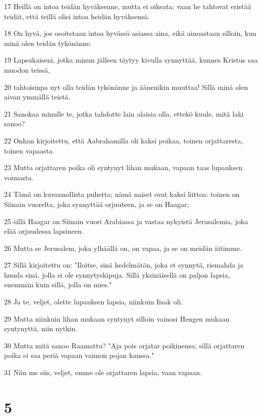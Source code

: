 \par 17 Heillä on intoa teidän hyväksenne, mutta ei oikeata; vaan he tahtovat eristää teidät, että teillä olisi intoa heidän hyväksensä.
\par 18 On hyvä, jos osoitetaan intoa hyvässä asiassa aina, eikä ainoastaan silloin, kun minä olen teidän tykönänne.
\par 19 Lapsukaiseni, jotka minun jälleen täytyy kivulla synnyttää, kunnes Kristus saa muodon teissä,
\par 20 tahtoisinpa nyt olla teidän tykönänne ja äänenikin muuttaa! Sillä minä olen aivan ymmällä teistä.
\par 21 Sanokaa minulle te, jotka tahdotte lain alaisia olla, ettekö kuule, mitä laki sanoo?
\par 22 Onhan kirjoitettu, että Aabrahamilla oli kaksi poikaa, toinen orjattaresta, toinen vapaasta.
\par 23 Mutta orjattaren poika oli syntynyt lihan mukaan, vapaan taas lupauksen voimasta.
\par 24 Tämä on kuvannollista puhetta; nämä naiset ovat kaksi liittoa: toinen on Siinain vuorelta, joka synnyttää orjuuteen, ja se on Haagar;
\par 25 sillä Haagar on Siinain vuori Arabiassa ja vastaa nykyistä Jerusalemia, joka elää orjuudessa lapsineen.
\par 26 Mutta se Jerusalem, joka ylhäällä on, on vapaa, ja se on meidän äitimme.
\par 27 Sillä kirjoitettu on: "Iloitse, sinä hedelmätön, joka et synnytä, riemahda ja huuda sinä, jolla ei ole synnytyskipuja. Sillä yksinäisellä on paljon lapsia, enemmän kuin sillä, jolla on mies."
\par 28 Ja te, veljet, olette lupauksen lapsia, niinkuin Iisak oli.
\par 29 Mutta niinkuin lihan mukaan syntynyt silloin vainosi Hengen mukaan syntynyttä, niin nytkin.
\par 30 Mutta mitä sanoo Raamattu? "Aja pois orjatar poikinensa; sillä orjattaren poika ei saa periä vapaan vaimon pojan kanssa."
\par 31 Niin me siis, veljet, emme ole orjattaren lapsia, vaan vapaan.

\chapter{5}

